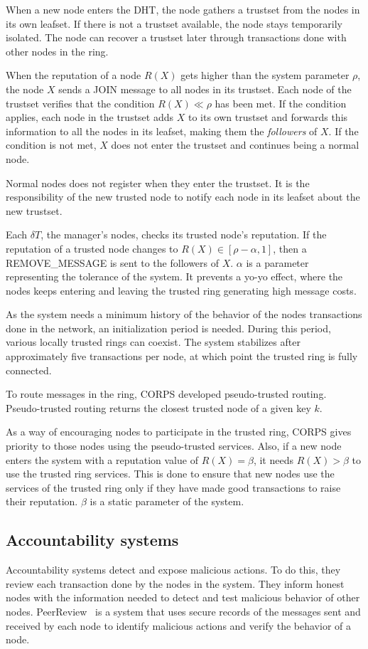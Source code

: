 When a new node enters the DHT, the node gathers a trustset from the nodes in its own
leafset. If there is not a trustset available, the node stays temporarily
isolated. The node can recover a trustset later through transactions done with
other nodes in the ring.

When the reputation of a node $R(X)$ gets higher than the system parameter
$\rho$, the node $X$ sends a JOIN message to all nodes in its trustset. Each
node of the trustset verifies that the condition $R(X) \ll \rho$ has been met.
If the condition  applies, each node in the trustset adds $X$ to its own trustset
and forwards this information to all the nodes in its leafset, making them the
\textit{followers} of $X$.
If the condition is not met, $X$ does not enter the trustset and continues
being a normal node.

Normal nodes does not register when they enter the trustset. It is the
responsibility of the new trusted node to notify each node in its leafset about
the new trustset.

Each $\delta T$, the manager's nodes, checks its trusted node's reputation. If
the reputation of a trusted node changes to $R(X) \in [\rho -\alpha, 1]$, then
a REMOVE\_MESSAGE is sent to the followers of $X$. $\alpha$ is a parameter
representing the tolerance of the system. It prevents a yo-yo effect, where the nodes keeps entering and
leaving the trusted ring generating high message costs.

As the system needs a minimum history of the behavior of the nodes transactions
done in the network, an initialization period is needed. During this period,
various locally trusted rings can coexist.
The system stabilizes after approximately five transactions per node, at which
point the trusted ring is fully connected.

To route messages in the ring, CORPS developed pseudo-trusted routing. Pseudo-trusted routing returns the closest trusted node of a given key $k$.

As a way of encouraging nodes to participate in the trusted ring, CORPS gives
priority to those nodes using the pseudo-trusted services.
Also, if a new node enters the system with a reputation value of $R(X) =
\beta$, it needs $R(X) > \beta$ to use the trusted ring services. This is
done to ensure that new nodes use the services of the trusted ring only if they
have made good transactions to raise their reputation. $\beta$ is a static parameter of the
system. 


\subsection{Accountability systems}
Accountability systems detect and expose malicious actions.
To do this, they review each transaction done by the nodes in the system. They
inform honest nodes with the information needed to detect and test
malicious behavior of other nodes. PeerReview~\cite{haeberlen2007peerreview} is a system that
uses secure records of the messages sent and received by each node to identify
malicious actions and verify the behavior of a node.

